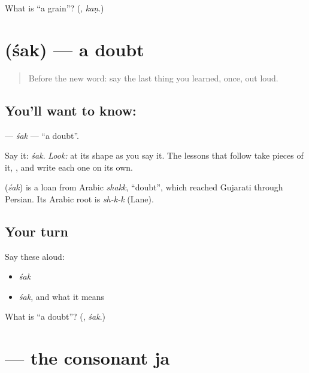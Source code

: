 \begin{tcolorbox}[breakable,colback=teal!4,colframe=teal!35!black,title={Before you move on}]
What is \textquotedblleft{}a grain\textquotedblright{}? (\textbf{}, \emph{kaṇ}.)
\end{tcolorbox}
\section[\texorpdfstring{\gu{શક} (śak)}{શક (śak)}]{ (śak) — a doubt}

\label{lesson:GU-C03-shak}



\begin{quote}
Before the new word: say the last thing you learned, once, out loud.
\end{quote}

\subsection*{You'll want to know: }
\textbf{} — \emph{śak} — \textquotedblleft{}a doubt\textquotedblright{}.

Say it: \emph{śak}. \emph{Look:} at its shape as you say it. The lessons that follow take pieces of it, \textbf{}, and write each one on its own.

\begin{cousinweb}
\textbf{} (\emph{śak}) is a loan from Arabic \emph{shakk}, \textquotedblleft{}doubt\textquotedblright{}, which reached Gujarati through Persian. Its Arabic root is \emph{sh-k-k} (Lane).
\end{cousinweb}

\subsection*{Your turn}
Say these aloud:

\begin{itemize}
\raggedright
  \item \emph{śak}
  \item \emph{śak}, and what it means
\end{itemize}

\begin{tcolorbox}[breakable,colback=teal!4,colframe=teal!35!black,title={Before you move on}]
What is \textquotedblleft{}a doubt\textquotedblright{}? (\textbf{}, \emph{śak}.)
\end{tcolorbox}
\section[\texorpdfstring{\gu{જ} (ja)}{જ (ja)}]{ — the consonant ja}

